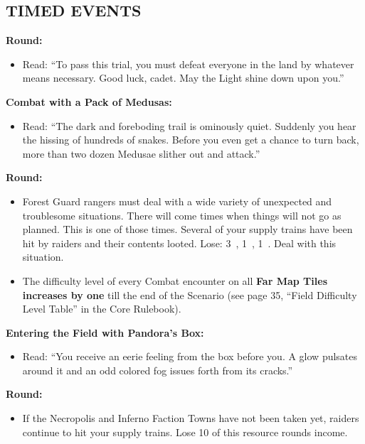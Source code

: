 \begin{multicols*}{2}
\subsection*{\MakeUppercase{Timed Events}}

\textbf{ Round:}
\begin{itemize}
  \item Read: ``To pass this trial, you must defeat everyone in the land by whatever means necessary.
    Good luck, cadet.
    May the Light shine down upon you.''
  \end{itemize}

\textbf{Combat with a Pack of Medusas:}
\begin{itemize}
  \item Read: ``The dark and foreboding trail is ominously quiet.
    Suddenly you hear the hissing of hundreds of snakes.
    Before you even get a chance to turn back, more than two dozen Medusae slither out and attack.''
\end{itemize}

\textbf{ Round:}
\begin{itemize}
  \item Forest Guard rangers must deal with a wide variety of unexpected and troublesome situations.
    There will come times when things will not go as planned.
    This is one of those times.
    Several of your supply trains have been hit by raiders and their contents looted.
    Lose: 3~, 1~, 1~.
    Deal with this situation.
  \item The difficulty level of every Combat encounter on all \textbf{Far Map Tiles increases by one} till the end of the Scenario (see page 35, ``Field Difficulty Level Table'' in the Core Rulebook).
\end{itemize}

\textbf{Entering the Field with Pandora's Box:}
\begin{itemize}
  \item Read: ``You receive an eerie feeling from the box before you.
    A glow pulsates around it and an odd colored fog issues forth from its cracks.''
\end{itemize}

\textbf{ Round:}
\begin{itemize}
  \item If the Necropolis and Inferno Faction Towns have not been taken yet, raiders continue to hit your supply trains.
    Lose 10  of this resource rounds income.
\end{itemize}


\end{multicols*}
